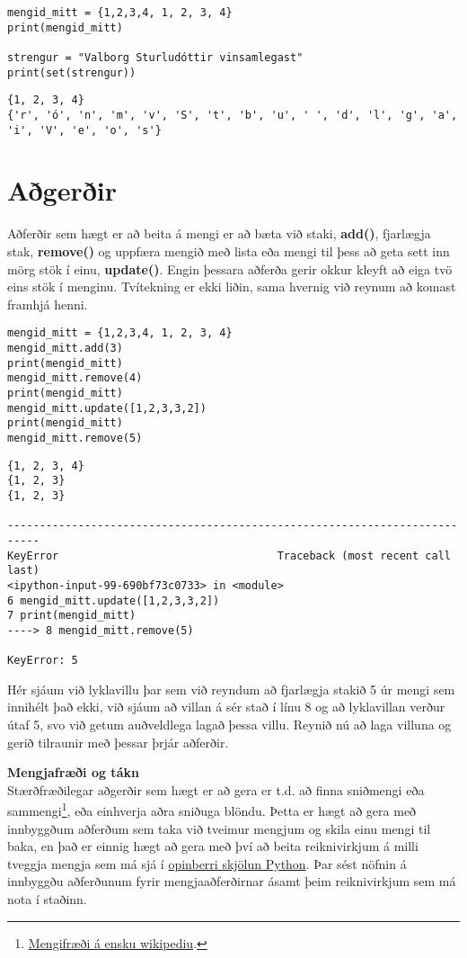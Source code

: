\begin{lstlisting}[caption=Mengi skilgreind, label=lst:set-duplicate]
mengid_mitt = {1,2,3,4, 1, 2, 3, 4}
print(mengid_mitt) 

strengur = "Valborg Sturludóttir vinsamlegast"
print(set(strengur))
\end{lstlisting}
\lstset{style=uttak}
\begin{lstlisting}
{1, 2, 3, 4}
{'r', 'ó', 'n', 'm', 'v', 'S', 't', 'b', 'u', ' ', 'd', 'l', 'g', 'a', 'i', 'V', 'e', 'o', 's'}
\end{lstlisting}
\lstset{style=venjulegt}

\section{Aðgerðir}
Aðferðir sem hægt er að beita á mengi er að bæta við staki, \textbf{add()}, fjarlægja stak, \textbf{remove()} og uppfæra mengið með lista eða mengi til þess að geta sett inn mörg stök í einu, \textbf{update()}.
Engin þessara aðferða gerir okkur kleyft að eiga tvö eins stök í menginu.
Tvítekning er ekki liðin, sama hvernig við reynum að komast framhjá henni.

\begin{lstlisting}[caption=Mengja aðferðir, label=lst:set-method]
mengid_mitt = {1,2,3,4, 1, 2, 3, 4}
mengid_mitt.add(3)
print(mengid_mitt)
mengid_mitt.remove(4)
print(mengid_mitt)
mengid_mitt.update([1,2,3,3,2])
print(mengid_mitt)
mengid_mitt.remove(5)
\end{lstlisting}
\lstset{style=uttak}
\begin{lstlisting}
{1, 2, 3, 4}
{1, 2, 3}
{1, 2, 3}

---------------------------------------------------------------------------
KeyError                                  Traceback (most recent call last)
<ipython-input-99-690bf73c0733> in <module>
6 mengid_mitt.update([1,2,3,3,2])
7 print(mengid_mitt)
----> 8 mengid_mitt.remove(5)

KeyError: 5
\end{lstlisting}
\lstset{style=venjulegt}

Hér sjáum við lyklavillu þar sem við reyndum að fjarlægja stakið 5 úr mengi sem innihélt það ekki, við sjáum að villan á sér stað í línu 8 og að lyklavillan verður útaf 5, svo við getum auðveldlega lagað þessa villu.
Reynið nú að laga villuna og gerið tilraunir með þessar þrjár aðferðir.

\begin{itarefni}
\textbf{Mengjafræði og tákn}\\
Stærðfræðilegar aðgerðir sem hægt er að gera er t.d. að finna sniðmengi eða sammengi\footnote{\href{https://en.wikipedia.org/wiki/Set_(mathematics)}{Mengifræði á ensku wikipediu}.}, eða einhverja aðra sniðuga blöndu. Þetta er hægt að gera með innbyggðum aðferðum sem taka við tveimur mengjum og skila einu mengi til baka, en það er einnig hægt að gera með því að beita reiknivirkjum á milli tveggja mengja sem má sjá í \href{https://docs.python.org/3/library/stdtypes.html#set}{opinberri skjölun Python}.
Þar sést nöfnin á innbyggðu aðferðunum fyrir mengjaaðferðirnar ásamt þeim reiknivirkjum sem má nota í staðinn.
\end{itarefni}

